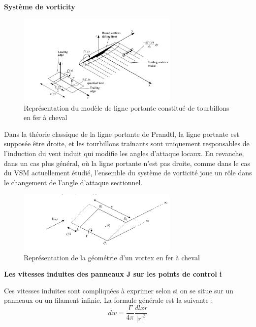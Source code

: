 \documentclass[conference]{IEEEtran}
\begin{document}
\textbf{Système de vorticity}
\begin{figure}[H]
    \centering
    \includegraphics[width=0.7\textwidth]{Pics/vortex VSM.png}
    \caption{Représentation du modèle de ligne portante constitué de tourbillons en fer à cheval}
    \label{fig: vortex vsm}
\end{figure}


Dans la théorie classique de la ligne portante de Prandtl, la ligne portante est supposée être droite, et les tourbillons traînants sont uniquement responsables de l'induction du vent induit qui modifie les angles d'attaque locaux. En revanche, dans un cas plus général, où la ligne portante n'est pas droite, comme dans le cas du VSM actuellement étudié, l'ensemble du système de vorticité joue un rôle dans le changement de l'angle d'attaque sectionnel.\\

\begin{figure}[H]
    \centering
    \includegraphics[width=0.7\textwidth]{Pics/Panneaux VSM.png}
    \caption{Représentation de la géométrie d'un vortex en fer à cheval}
    \label{fig:panneau vsm}
\end{figure}

\textbf{Les vitesses induites des panneaux J sur les points de control i}

Ces vitesses induites sont compliquées à exprimer selon si on se situe sur un panneaux ou un filament infinie. La formule générale est la suivante : 
\begin{equation}
    dw = \frac{\Gamma}{4 \pi} \frac{dl x r}{|r|^3}
\end{equation}
\end{document}
